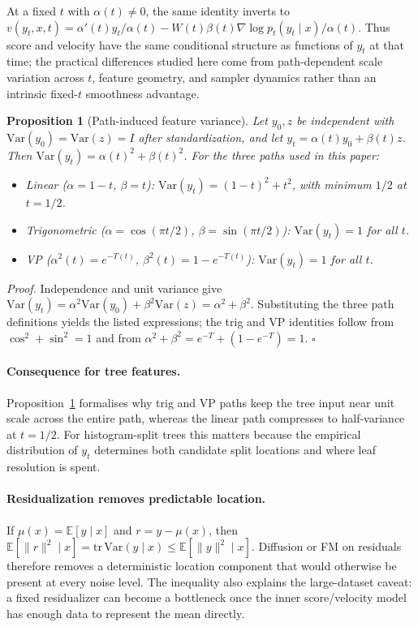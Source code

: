 \documentclass{uai2026}
\newcommand{\E}{\mathbb{E}}
\newcommand{\Var}{\mathrm{Var}}
\newtheorem{proposition}{Proposition}
\begin{document}
At a fixed $t$ with $\alpha(t)\neq0$, the same identity inverts to $v(y_t,x,t)=\alpha'(t)y_t/\alpha(t)-W(t)\beta(t)\nabla\log p_t(y_t\mid x)/\alpha(t)$. Thus score and velocity have the same conditional structure as functions of $y_t$ at that time; the practical differences studied here come from path-dependent scale variation across $t$, feature geometry, and sampler dynamics rather than an intrinsic fixed-$t$ smoothness advantage.

\begin{proposition}[Path-induced feature variance]\label{prop:path-variance}
Let $y_0,z$ be independent with $\Var(y_0)=\Var(z)=I$ after standardization, and let $y_t=\alpha(t)y_0+\beta(t)z$. Then $\Var(y_t)=\alpha(t)^2+\beta(t)^2$. For the three paths used in this paper:
\begin{itemize}
  \item Linear ($\alpha=1-t$, $\beta=t$): $\Var(y_t)=(1-t)^2+t^2$, with minimum $1/2$ at $t=1/2$.
  \item Trigonometric ($\alpha=\cos(\pi t/2)$, $\beta=\sin(\pi t/2)$): $\Var(y_t)=1$ for all $t$.
  \item VP ($\alpha^2(t)=e^{-T(t)}$, $\beta^2(t)=1-e^{-T(t)}$): $\Var(y_t)=1$ for all $t$.
\end{itemize}
\end{proposition}
\emph{Proof.} Independence and unit variance give $\Var(y_t)=\alpha^2\Var(y_0)+\beta^2\Var(z)=\alpha^2+\beta^2$. Substituting the three path definitions yields the listed expressions; the trig and VP identities follow from $\cos^2+\sin^2=1$ and from $\alpha^2+\beta^2=e^{-T}+(1-e^{-T})=1$. \hfill$\square$

\paragraph{Consequence for tree features.} Proposition~\ref{prop:path-variance} formalises why trig and VP paths keep the tree input near unit scale across the entire path, whereas the linear path compresses to half-variance at $t=1/2$. For histogram-split trees this matters because the empirical distribution of $y_t$ determines both candidate split locations and where leaf resolution is spent.

\paragraph{Residualization removes predictable location.} If $\mu(x)=\E[y\mid x]$ and $r=y-\mu(x)$, then $\E[\|r\|^2\mid x]=\mathrm{tr}\,\Var(y\mid x)\leq \E[\|y\|^2\mid x]$. Diffusion or FM on residuals therefore removes a deterministic location component that would otherwise be present at every noise level. The inequality also explains the large-dataset caveat: a fixed residualizer can become a bottleneck once the inner score/velocity model has enough data to represent the mean directly.
\end{document}
